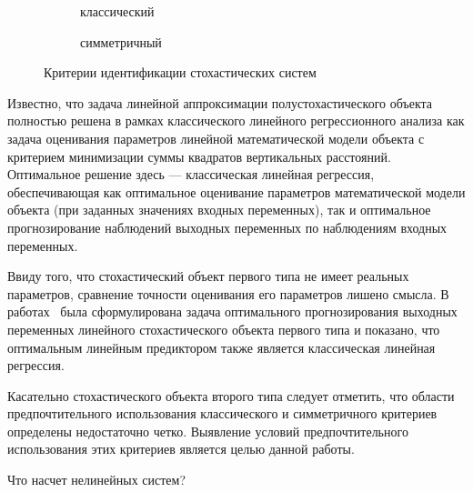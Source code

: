 \begin{figure}[h]
  \begin{subfigure}[b]{0.5\linewidth}
    \centering
    \caption{классический}\label{fig:criteria_classic}
  \end{subfigure}
  \hfill
  \begin{subfigure}[b]{0.5\linewidth}
    \centering
    \caption{симметричный}\label{fig:criteria_symmetric}
  \end{subfigure}

  \vspace{\baselineskip}
  \caption{Критерии идентификации стохастических систем}
\end{figure}

Известно, что задача линейной аппроксимации полустохастического объекта полностью решена в
рамках классического линейного регрессионного анализа как задача оценивания параметров
линейной математической модели объекта с критерием минимизации суммы квадратов вертикальных расстояний.
Оптимальное решение здесь --- классическая линейная регрессия,
обеспечивающая как оптимальное оценивание параметров математической модели объекта
(при заданных значениях входных переменных),
так и оптимальное прогнозирование наблюдений выходных переменных по наблюдениям входных переменных.

Ввиду того, что стохастический объект первого типа не имеет реальных параметров,
сравнение точности оценивания его параметров лишено смысла.
В работах~\cite{mukha_2010, mukha_2011} была сформулирована задача оптимального прогнозирования
выходных переменных линейного стохастического объекта первого типа и показано,
что оптимальным линейным предиктором также является классическая линейная регрессия.

Касательно стохастического объекта второго типа следует отметить,
что области предпочтительного использования классического и симметричного критериев
определены недостаточно четко.
Выявление условий предпочтительного использования этих критериев является целью данной работы.

{\color{red} Что насчет нелинейных систем?}



